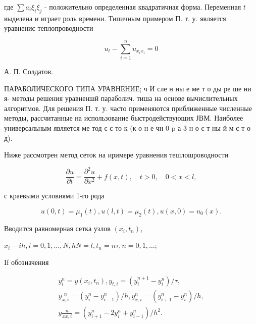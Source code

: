 \documentclass[10pt]{article}
\begin{document}
где $\sum a_{i} \xi_{i} \xi_{j}$ - положительно определенная квадратичная форма. Переменная $t$ выделена и играет роль времени. Типичным примером П. т. у. является уравненис теплопроводности



\[

u_{t}-\sum_{i=1}^{n} u_{x_{i} x_{i}}=0

\]



А. П. Солдатов.



ПАРАБОЛИЧЕСКОГО ТИПА УРАВНЕНИЕ; ч И сле н ны е ме т о ды ре ше ни я- методы решения уравненшй параболич. тиша на основе вычислительных алгоритмов. Для решения П. т. у. часто применяются приближенные численные методы, рассчитанные на использование быстродействующих ЈВМ. Наиболее универсальным является ме тод с с то к (к о н е чн 0 p а 3 н о с т ны й м с т о д).



Ниже рассмотрен метод сеток на иримере уравнения тешлошроводности



\[

\frac{\partial u}{\partial t}=\frac{\partial^{2} u}{\partial x^{2}}+f(x, t), \quad t>0, \quad 0<x<l,

\]



с краевыми условиями 1-го рода



\[

u(0, t)=\mu_{1}(t), u(l, t)=\mu_{2}(t), u(x, 0)=u_{0}(x) .

\]



Вводится равномерная сетка узлов $\left(x_{i}, t_{n}\right)$,



$x_{i}-i h, i=0,1, \ldots, N, h N=l, t_{n}=n \tau, n=0,1, \ldots ;$



If обозначения



\[

\begin{gathered}

y_{i}^{n}=y\left(x_{i}, t_{n}\right), y_{t, i}=\left(y_{i}^{n+1}-y_{i}^{n}\right) / \tau, \\

y \frac{n}{x_{1} i}=\left(y_{i}^{n}-y_{i-1}^{n}\right) / h, y_{x, i}^{n}=\left(y_{i+1}^{n}-y_{i}^{n}\right) / h, \\

y \frac{n}{x x, i}=\left(y_{i+1}^{n}-2 y_{i}^{n}+y_{i-1}^{n}\right) / h^{2} .

\end{gathered}

\]
\end{document}
